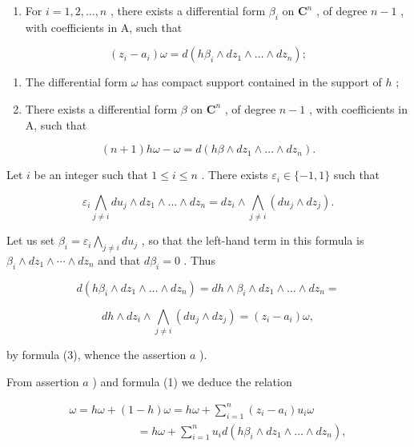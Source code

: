\begin{enumerate}
\def\labelenumi{\alph{enumi})}
\tightlist
\item
  For \(i = 1,2,\ldots,n\) , there exists a differential form \(\beta_{i}\) on \(\mathbf{C}^{n}\) , of degree \(n - 1\) , with coefficients in A, such that
\end{enumerate}

\[
(z _ {i} - a _ {i}) \omega = d (h \beta_ {i} \wedge d z _ {1} \wedge \dots \wedge d z _ {n});
\]

\begin{enumerate}
\def\labelenumi{\alph{enumi})}
\setcounter{enumi}{1}
\item
  The differential form \(\omega\) has compact support contained in the support of \(h\) ;
\item
  There exists a differential form \(\beta\) on \(\mathbf{C}^{n}\) , of degree \(n - 1\) , with coefficients in A, such that
\end{enumerate}

\[
(n + 1) h \omega - \omega = d (h \beta \wedge d z _ {1} \wedge \dots \wedge d z _ {n}).
\]

Let \(i\) be an integer such that \(1 \leqslant i \leqslant n\) . There exists \(\varepsilon_i \in \{-1, 1\}\) such that

\[
\varepsilon_ {i} \bigwedge_ {j \neq i} d u _ {j} \wedge d z _ {1} \wedge \dots \wedge d z _ {n} = d z _ {i} \wedge \bigwedge_ {j \neq i} (d u _ {j} \wedge d z _ {j}).
\]

Let us set \(\beta_{i} = \varepsilon_{i} \bigwedge_{j \neq i} du_{j}\) , so that the left-hand term in this formula is \(\beta_{i} \wedge dz_{1} \wedge \cdots \wedge dz_{n}\) and that \(d\beta_{i} = 0\) . Thus

\[
d \left(h \beta_ {i} \wedge d z _ {1} \wedge \dots \wedge d z _ {n}\right) = d h \wedge \beta_ {i} \wedge d z _ {1} \wedge \dots \wedge d z _ {n} =
\]

\[
d h \wedge d z _ {i} \wedge \bigwedge_ {j \neq i} (d u _ {j} \wedge d z _ {j}) = (z _ {i} - a _ {i}) \omega ,
\]

by formula (3), whence the assertion \(a\) ).

From assertion \(a\) ) and formula (1) we deduce the relation

\[
\begin{array}{l} \omega = h \omega + (1 - h) \omega = h \omega + \sum_ {i = 1} ^ {n} (z _ {i} - a _ {i}) u _ {i} \omega \\ \qquad \qquad \qquad = h \omega + \sum_ {i = 1} ^ {n} u _ {i}   d (h \beta_ {i} \wedge d z _ {1} \wedge \dots \wedge d z _ {n}), \end{array}
\]


